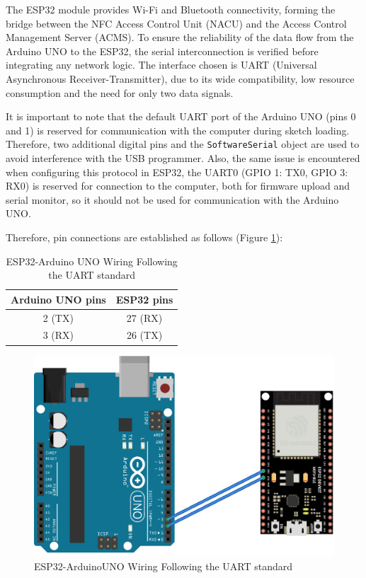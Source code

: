 The ESP32 module provides Wi-Fi and Bluetooth connectivity, forming the bridge between the NFC Access Control Unit (NACU) and the Access Control Management Server (ACMS). To ensure the reliability of the data flow from the Arduino UNO to the ESP32, the serial interconnection is verified before integrating any network logic. The interface chosen is UART (Universal Asynchronous Receiver-Transmitter), due to its wide compatibility, low resource consumption and the need for only two data signals.

It is important to note that the default UART port of the Arduino UNO (pins 0 and 1) is reserved for communication with the computer during sketch loading. Therefore, two additional digital pins and the \texttt{SoftwareSerial} object are used to avoid interference with the USB programmer. Also, the same issue is encountered when configuring this protocol in ESP32, the UART0 (GPIO 1: TX0, GPIO 3: RX0) is reserved for connection to the computer, both for firmware upload and serial monitor, so it should not be used for communication with the Arduino UNO.

Therefore, pin connections are established as follows (Figure \ref{fig:ESP32-ArduinoUno}):

\begin{table}[H]
	\centering
	\begin{tabular}{|c|c|}
		\hline
		\textbf{Arduino UNO pins} & \textbf{ESP32 pins} \\
		\hline
		2 (TX) & 27 (RX) \\
		3 (RX) & 26 (TX) \\
		\hline
	\end{tabular}
	\caption{ESP32-Arduino UNO Wiring Following the UART standard}
	\label{tab:esp32_arduino_uart}
\end{table}

\begin{figure}[H]
	\centering
	\includegraphics[width=\textwidth]{imaxes/esp32UNO}
	\caption{ESP32-ArduinoUNO Wiring Following the UART standard}
	\label{fig:ESP32-ArduinoUno}
\end{figure}


